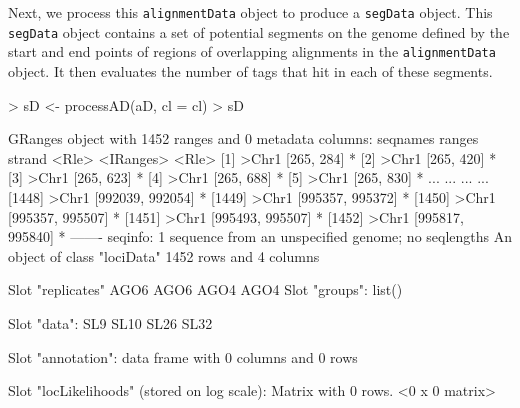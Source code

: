 \documentclass[a4paper]{article}
\begin{document}
Next, we process this \verb'alignmentData' object to produce a \verb'segData' object. This \verb'segData' object contains a set of potential segments on the genome defined by the start and end points of regions of overlapping alignments in the \verb'alignmentData' object. It then evaluates the number of tags that hit in each of these segments.

\begin{Schunk}
\begin{Sinput}
> sD <- processAD(aD, cl = cl)
> sD
\end{Sinput}
\begin{Soutput}
GRanges object with 1452 ranges and 0 metadata columns:
         seqnames           ranges strand
            <Rle>        <IRanges>  <Rle>
     [1]    >Chr1       [265, 284]      *
     [2]    >Chr1       [265, 420]      *
     [3]    >Chr1       [265, 623]      *
     [4]    >Chr1       [265, 688]      *
     [5]    >Chr1       [265, 830]      *
     ...      ...              ...    ...
  [1448]    >Chr1 [992039, 992054]      *
  [1449]    >Chr1 [995357, 995372]      *
  [1450]    >Chr1 [995357, 995507]      *
  [1451]    >Chr1 [995493, 995507]      *
  [1452]    >Chr1 [995817, 995840]      *
  -------
  seqinfo: 1 sequence from an unspecified genome; no seqlengths
An object of class "lociData"
1452 rows and 4 columns

Slot "replicates"
AGO6 AGO6 AGO4 AGO4
Slot "groups":
list()

Slot "data":
     SL9 SL10 SL26 SL32

Slot "annotation":
data frame with 0 columns and 0 rows

Slot "locLikelihoods" (stored on log scale):
Matrix with  0  rows.
<0 x 0 matrix>
\end{Soutput}
\end{Schunk}
\end{document}
